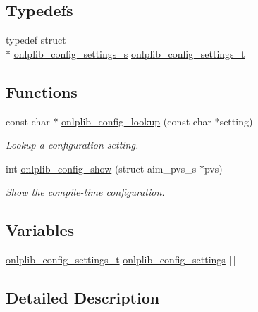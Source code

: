 \subsection*{Typedefs}
\begin{DoxyCompactItemize}
\item 
typedef struct \\*
\hyperlink{structonlplib__config__settings__s}{onlplib\+\_\+config\+\_\+settings\+\_\+s} \hyperlink{group__onlplib-config_ga893327b4949ae66bf46b7e455922be32}{onlplib\+\_\+config\+\_\+settings\+\_\+t}
\end{DoxyCompactItemize}
\subsection*{Functions}
\begin{DoxyCompactItemize}
\item 
const char $\ast$ \hyperlink{group__onlplib-config_ga173a1bd1f1c02ff430714ee90b7dc367}{onlplib\+\_\+config\+\_\+lookup} (const char $\ast$setting)
\begin{DoxyCompactList}\small\item\em Lookup a configuration setting. \end{DoxyCompactList}\item 
int \hyperlink{group__onlplib-config_ga792b2b68d162facde1416432151490f5}{onlplib\+\_\+config\+\_\+show} (struct aim\+\_\+pvs\+\_\+s $\ast$pvs)
\begin{DoxyCompactList}\small\item\em Show the compile-\/time configuration. \end{DoxyCompactList}\end{DoxyCompactItemize}
\subsection*{Variables}
\begin{DoxyCompactItemize}
\item 
\hyperlink{group__onlplib-config_ga893327b4949ae66bf46b7e455922be32}{onlplib\+\_\+config\+\_\+settings\+\_\+t} \hyperlink{group__onlplib-config_ga684d29e51f4e9bd7961adcd8871e745d}{onlplib\+\_\+config\+\_\+settings} \mbox{[}$\,$\mbox{]}
\end{DoxyCompactItemize}


\subsection{Detailed Description}


